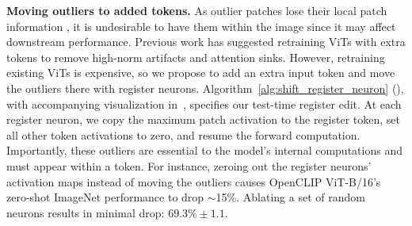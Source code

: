 \documentclass{article}
\begin{document}
\textbf{Moving outliers to added tokens.} As outlier patches lose their local patch information \citep{darcet2024vision}, it is undesirable to have them within the image since it may affect downstream performance. Previous work has suggested retraining ViTs with extra tokens to remove high-norm artifacts and attention sinks. However, retraining existing ViTs is expensive, so we propose to add an extra input token and move the outliers there with register neurons. Algorithm~\ref{alg:shift_register_neuron} (), with accompanying visualization in~, specifies our test-time register edit. At each register neuron, we copy the maximum patch activation to the register token, set all other token activations to zero, and resume the forward computation. Importantly, these outliers are essential to the model’s internal computations and must appear within a token. For instance, zeroing out the register neurons' activation maps instead of moving the outliers causes OpenCLIP ViT-B/16's zero-shot ImageNet performance to drop $\sim$15\%. Ablating a set of random neurons results in minimal drop: $69.3\%\pm1.1.$ 






\end{document}
